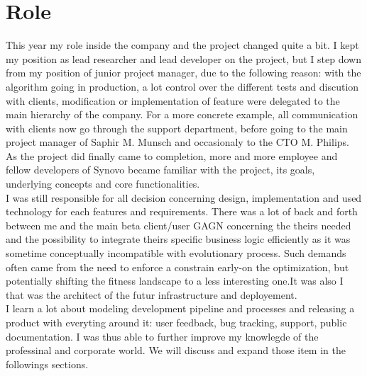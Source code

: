 \documentclass[12pt]{memoir}
\begin{document}
\section{Role}

This year my role inside the company and the project changed quite a bit. I kept
my position as lead researcher and lead developer on the project, but I step
down from my position of junior project manager, due to the following reason: with
the algorithm going in production, a lot control over the different tests and discution with
clients, modification or implementation of feature were delegated to the main
hierarchy of the company. For a more concrete example, all communication with clients now
go through the support department, before going to the main project manager of
Saphir M. Munsch and occasionaly to the CTO M. Philips.\\
As the project did finally came to completion, more and more employee and fellow
developers of Synovo became familiar with the project, its goals, underlying
concepts and core functionalities. \\
I was still responsible for all decision concerning design, implementation
and used technology for each features and requirements. There was a lot of back and
forth between me and the main beta client/user GAGN concerning the theirs needed and
the possibility to integrate theirs specific business logic efficiently as it was
sometime conceptually incompatible with evolutionary process. Such demands often
came from the need to enforce a constrain early-on the optimization, but potentially
shifting the fitness landscape to a less interesting one.It was also I that was the 
architect of the futur infrastructure and deployement. \\
I learn a lot about modeling development pipeline and processes and releasing a 
product with everyting around it: user feedback, bug tracking, support, public 
documentation. I was thus able to further improve my knowlegde of the professinal
 and corporate world. We will discuss and expand those item in the followings sections.
\end{document}
